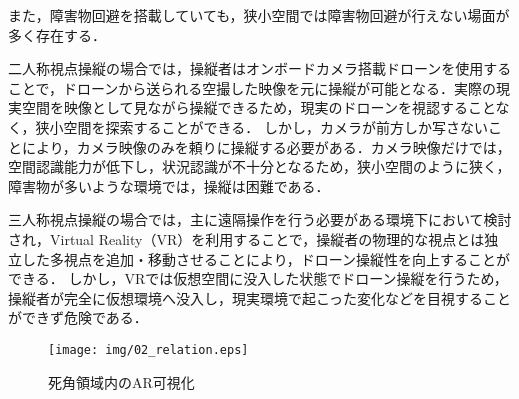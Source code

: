 \documentclass[submit, sigrecommended]{ipsj}
\begin{document}
また，障害物回避を搭載していても，狭小空間では障害物回避が行えない場面が多く存在する\cite{article-drone12}．
\par
二人称視点操縦の場合では，操縦者はオンボードカメラ搭載ドローンを使用することで，ドローンから送られる空撮した映像を元に操縦が可能となる\cite{article-drone08}．実際の現実空間を映像として見ながら操縦できるため，現実のドローンを視認することなく，狭小空間を探索することができる\cite{book-drone02}．
しかし，カメラが前方しか写さないことにより\cite{article-drone09}，カメラ映像のみを頼りに操縦する必要がある．カメラ映像だけでは，空間認識能力が低下し\cite{article-drone10}，状況認識が不十分となるため\cite{article-drone11}\cite{book-drone03}，狭小空間のように狭く，障害物が多いような環境では，操縦は困難である．
\par
三人称視点操縦の場合では，主に遠隔操作を行う必要がある環境下において検討され，Virtual Reality（VR）を利用することで，操縦者の物理的な視点とは独立した多視点を追加・移動させることにより，ドローン操縦性を向上することができる\cite{book-drone04}．
しかし，VRでは仮想空間に没入した状態でドローン操縦を行うため\cite{article-drone13}，操縦者が完全に仮想環境へ没入し，現実環境で起こった変化などを目視することができず危険である．


\begin{figure}[tb]
  \centering
  \texttt{[image: img/02\_relation.eps]}
  \caption{死角領域内のAR可視化}
  \label{fig:02_relation}
  \end{figure}
  
\end{document}
